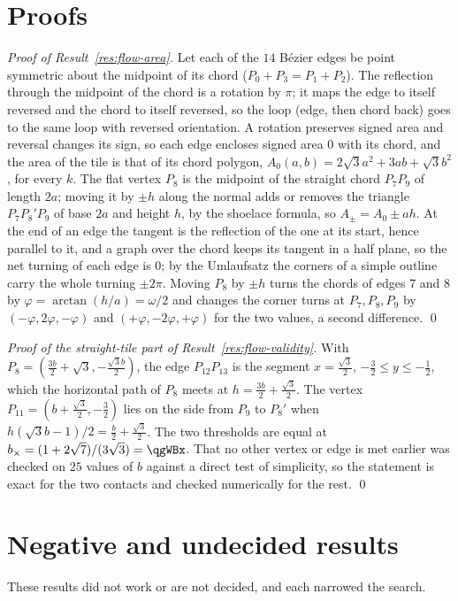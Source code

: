 \documentclass[11pt]{article}
\theoremstyle{definition}
\begin{document}
\appendix

\section{Proofs}\label{app:proofs}
\emph{Proof of Result~\ref{res:flow-area}.} Let each of the $14$ B\'ezier edges be point symmetric about the midpoint of its chord ($P_0+P_3=P_1+P_2$). The reflection through the midpoint of the chord is a rotation by $\pi$; it maps the edge to itself reversed and the chord to itself reversed, so the loop (edge, then chord back) goes to the same loop with reversed orientation. A rotation preserves signed area and reversal changes its sign, so each edge encloses signed area $0$ with its chord, and the area of the tile is that of its chord polygon, $A_0(a,b)=2\sqrt3a^2+3ab+\sqrt3b^2$, for every $k$. The flat vertex $P_8$ is the midpoint of the straight chord $P_7P_9$ of length $2a$; moving it by $\pm h$ along the normal adds or removes the triangle $P_7P_8'P_9$ of base $2a$ and height $h$, by the shoelace formula, so $A_\pm=A_0\pm ah$. At the end of an edge the tangent is the reflection of the one at its start, hence parallel to it, and a graph over the chord keeps its tangent in a half plane, so the net turning of each edge is $0$; by the Umlaufsatz the corners of a simple outline carry the whole turning $\pm2\pi$. Moving $P_8$ by $\pm h$ turns the chords of edges $7$ and $8$ by $\varphi=\arctan(h/a)=\omega/2$ and changes the corner turns at $P_7,P_8,P_9$ by $(-\varphi,2\varphi,-\varphi)$ and $(+\varphi,-2\varphi,+\varphi)$ for the two values, a second difference. \qed

\emph{Proof of the straight-tile part of Result~\ref{res:flow-validity}.} With $P_8=(\tfrac{3b}2+\sqrt3,-\tfrac{\sqrt3b}2)$, the edge $P_{12}P_{13}$ is the segment $x=\tfrac{\sqrt3}2$, $-\tfrac32\le y\le-\tfrac12$, which the horizontal path of $P_8$ meets at $h=\tfrac{3b}2+\tfrac{\sqrt3}2$. The vertex $P_{11}=(b+\tfrac{\sqrt3}2,-\tfrac32)$ lies on the side from $P_9$ to $P_8'$ when $h(\sqrt3b-1)/2=\tfrac b2+\tfrac{\sqrt3}2$. The two thresholds are equal at $b_\times=(1+2\sqrt7)/(3\sqrt3)=\qgWBx$. That no other vertex or edge is met earlier was checked on $25$ values of $b$ against a direct test of simplicity, so the statement is exact for the two contacts and checked numerically for the rest. \qed


\footnotesize
\section{Negative and undecided results}\label{app:neg}
These results did not work or are not decided, and each narrowed the search.
\end{document}
